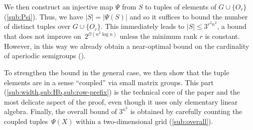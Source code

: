 \documentclass{lmcs}
\theoremstyle{definition}
\newcommand{\OO}{\mathcal{O}}
\begin{document}
We then construct an injective map $\Psi$ from $S$ to tuples of elements of $G \cup \{O_r\}$ (\cref{sub:Psi}). Thus, we have $|S| = |\Psi(S)|$ and so it suffices to bound the number of distinct tuples over $G \cup \{O_r\}$. This immediately leads to $|S| \le 3^{r^2 n^2}$, a bound that does not improve on~$2^{\OO(n^2 \log n)}$ unless the minimum rank $r$ is constant. However, in this way we already obtain a near-optimal bound on the cardinality of aperiodic semigroups ().

To strengthen the bound in the general case, we then show that the tuple elements are in a sense ``coupled'' via small matrix groups. %
This part (\cref{sub:width,sub:Hb,sub:row-prefix}) is the technical core of the paper and the most delicate aspect of the proof, even though it uses only elementary linear algebra.
Finally, the overall bound of $3^{n^2}$ is obtained by carefully counting the coupled tuples~$\Psi(X)$ within a two-dimensional grid (\cref{sub:overall}).


 

\end{document}
